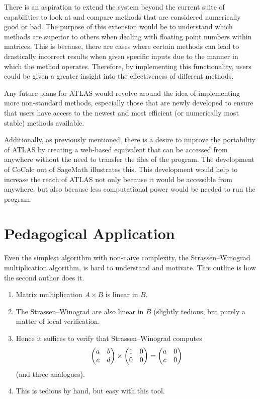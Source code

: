 \documentclass[
]{ceurart}
\begin{document}
There is an aspiration to extend the system beyond the current suite of capabilities to look at and compare methods that are considered numerically good or bad. The purpose of this extension would be to understand which methods are superior to others when dealing with floating point numbers within matrices. This is because, there are cases where certain methods can lead to drastically incorrect results when given specific inputs due to the manner in which the method operates. Therefore, by implementing this functionality, users could be given a greater insight into the effectiveness of different methods.

Any future plans for ATLAS would revolve around the idea of implementing more non-standard methods, especially those that are newly developed to ensure that users have access to the newest and most efficient (or numerically most stable) methods available. 

Additionally, as previously mentioned, there is a desire to improve the portability of ATLAS by creating a web-based equivalent that can be accessed from anywhere without the need to transfer the files of the program. The development of CoCalc out of SageMath illustrates this. This development would help to increase the reach of ATLAS not only because it would be accessible from anywhere, but also because less computational power would be needed to run the program. 

\section{Pedagogical Application}
Even the simplest algorithm with non-na\"\i{}ve complexity, the Strassen--Winograd multiplication algorithm, is hard to understand and motivate. This outline is how the second author does it.
\begin{enumerate}
\item Matrix multiplication $A\times B$ is linear in $B$.
\item The Strassen--Winograd are also linear in $B$ (slightly tedious, but purely a matter of local verification.
\item Hence it suffices to verify that Strassen--Winograd  computes
$$
\begin{pmatrix}
a&b\cr c&d
\end{pmatrix}\times
\begin{pmatrix}
1&0\cr0&0
\end{pmatrix}
=\begin{pmatrix}
a&0\cr c&0
\end{pmatrix}
$$
(and three analogues).
\item This is tedious by hand, but easy with this tool.
\end{enumerate}
\end{document}
